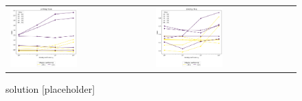 \begin{figure}[h!]
    \centering
    \begin{tabular}{p{} p{}}
        \vspace{0pt} 
        \includegraphics[width=0.49\textwidth]{../figs/parametric/burgers_1D/orders_unlimited}
        &
        \vspace{0pt} 
        \includegraphics[width=0.49\textwidth]{../figs/parametric/burgers_1D/orders_limited}
    \end{tabular}
    \caption{ solution [\todo placeholder]}
    \label{fig:burgess_sol}
\end{figure}



